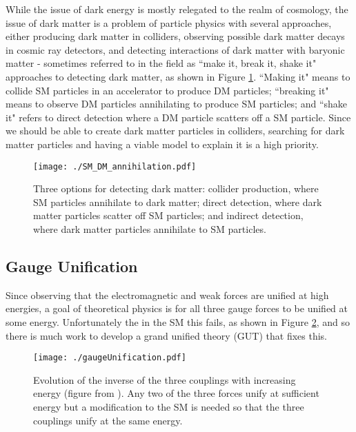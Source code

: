 While the issue of dark energy is mostly relegated to the realm of cosmology, the issue of dark matter is a problem of particle physics with several approaches, either producing dark matter in colliders, observing possible dark matter decays in cosmic ray detectors, and detecting interactions of dark matter with baryonic matter - sometimes referred to in the field as ``make it, break it, shake it" approaches to detecting dark matter, as shown in Figure \ref{fig:dmMake}.  ``Making it" means to collide SM particles in an accelerator to produce DM particles; ``breaking it" means to observe DM particles annihilating to produce SM particles; and ``shake it" refers to direct detection where a DM particle scatters off a SM particle.  Since we should be able to create dark matter particles in colliders, searching for dark matter particles and having a viable model to explain it is a high priority.  \\


\begin{figure}[h!]
  \centering
	\texttt{[image: ./SM\_DM\_annihilation.pdf]}
\caption[Make it, break it, shake it]{\label{fig:dmMake}{Three options for detecting dark matter: collider production, where SM particles annihilate to dark matter; direct detection, where dark matter particles scatter off SM particles; and indirect detection, where dark matter particles annihilate to SM particles.  }} 
\end{figure}

\subsection{Gauge Unification}
\label{gaugeUni}

Since observing that the electromagnetic and weak forces are unified at high energies, a goal of theoretical physics is for all three gauge forces to be unified at some energy.  Unfortunately the in the SM this fails, as shown in Figure \ref{fig:gaugeUni}, and so there is much work to develop a grand unified theory (GUT) that fixes this.  \\

\begin{figure}[h!]
  \centering
	\texttt{[image: ./gaugeUnification.pdf]}
\caption[Coupling evolution]{\label{fig:gaugeUni}{ Evolution of the inverse of the three couplings with increasing energy (figure from \cite{Kazakov}).  Any two of the three forces unify at sufficient energy but a modification to the SM is needed so that the three couplings unify at the same energy.  }} 
\end{figure}



